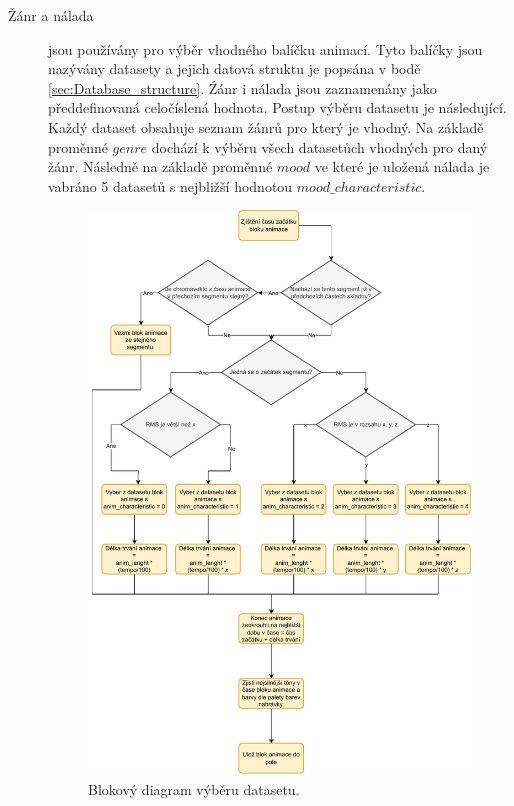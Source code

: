 \begin{description}
    \item[Žánr a nálada] jsou používány pro výběr vhodného balíčku animací. Tyto balíčky jsou nazývány datasety a jejich datová struktu je popsána v bodě \ref{sec:Database_structure}. Źánr i nálada jsou zaznamenány jako předdefinovaná celočíslená hodnota. Postup výběru datasetu je následující. Každý dataset obsahuje seznam žánrů pro který je vhodný. Na základě proměnné $genre$ dochází k výběru všech datasetůch vhodných pro daný žánr. Následně na základě proměnné $mood$ ve které je uložená nálada je vabráno 5 datasetů s nejbližší hodnotou $mood\_characteristic$.
    
    \begin{figure}[H]
        \centering
        \includegraphics[width = 1\linewidth]{obrazky/Dataset_selection_diagram.pdf}
        \caption{Blokový diagram výběru datasetu.}
        \label{fig:Dataset_selection_diagram}
    \end{figure}


\end{description}
